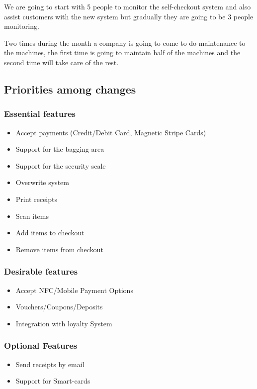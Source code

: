 \noindent
We are going to start with 5 people to monitor the self-checkout system and 
also assist customers with the new system but gradually they are going to be 
3 people monitoring.  
\newline

\noindent
Two times during the month a company is going to come to do maintenance to the 
machines, the first time is going to maintain half of the machines and the 
second time will take care of the rest. 


\subsection{Priorities among changes}

\subsubsection{Essential features}
\begin{itemize}
    \item Accept payments (Credit/Debit Card, Magnetic Stripe Cards)
    \item Support for the bagging area
    \item Support for the security scale
    \item Overwrite system
    \item Print receipts
    \item Scan items 
    \item Add items to checkout 
    \item Remove items from checkout 
\end{itemize}

\subsubsection{Desirable features}
\begin{itemize}
	\item Accept NFC/Mobile Payment Options
    \item Vouchers/Coupons/Deposits
    \item Integration with loyalty System
\end{itemize}

\subsubsection{Optional Features}
\begin{itemize}
    \item Send receipts by email
    \item Support for Smart-cards
\end{itemize}

